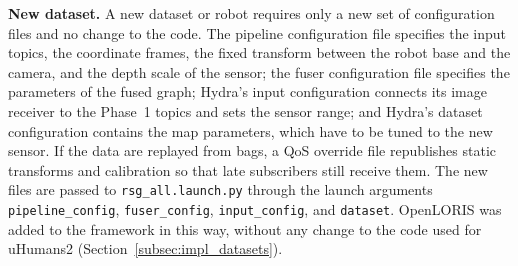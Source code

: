 {\small \textbf{New dataset.} A new dataset or robot requires only a new set of configuration files and no change to the code. The pipeline configuration file specifies the input topics, the coordinate frames, the fixed transform between the robot base and the camera, and the depth scale of the sensor; the fuser configuration file specifies the parameters of the fused graph; Hydra's input configuration connects its image receiver to the Phase~1 topics and sets the sensor range; and Hydra's dataset configuration contains the map parameters, which have to be tuned to the new sensor. If the data are replayed from bags, a QoS override file republishes static transforms and calibration so that late subscribers still receive them. The new files are passed to \texttt{rsg\_\allowbreak{}all.\allowbreak{}launch.\allowbreak{}py} through the launch arguments \texttt{pipeline\_\allowbreak{}config}, \texttt{fuser\_\allowbreak{}config}, \texttt{input\_\allowbreak{}config}, and \texttt{dataset}. OpenLORIS was added to the framework in this way, without any change to the code used for uHumans2 (Section~\ref{subsec:impl_datasets}).\par}